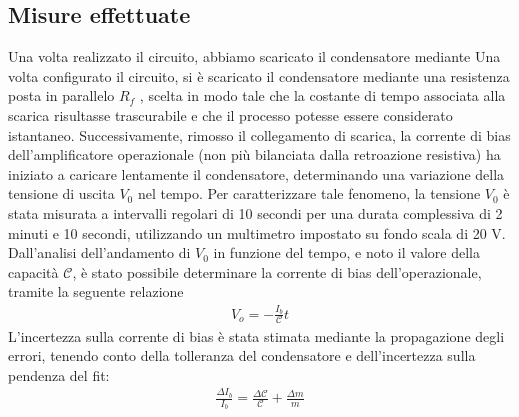 \documentclass[a4paper, oneside]{article}
\begin{document}
\subsection{Misure effettuate}
Una volta realizzato il circuito, abbiamo scaricato il condensatore mediante
Una volta configurato il circuito, si è scaricato il condensatore mediante una resistenza posta in parallelo $R_f$ , scelta in modo tale che la costante di tempo associata alla scarica risultasse trascurabile e che il processo potesse essere considerato istantaneo. Successivamente, rimosso il collegamento di scarica, la corrente di bias dell'amplificatore operazionale (non più bilanciata dalla retroazione resistiva) ha iniziato a caricare lentamente il condensatore, determinando una variazione della tensione di uscita $V_0$ nel tempo. Per caratterizzare tale fenomeno, la tensione $V_0$ è stata misurata a intervalli regolari di 10 secondi per una durata complessiva di 2 minuti e 10 secondi, utilizzando un multimetro impostato su fondo scala di 20 V. Dall'analisi dell'andamento di $V_0$ in funzione del tempo, e noto il valore della capacità $\mathcal{C}$, è stato possibile determinare la corrente di bias dell'operazionale, tramite la seguente relazione
\begin{align}
     V_o= - \frac{I_b}{\mathcal{C}} t
\end{align}
L'incertezza sulla corrente di bias è stata stimata mediante la propagazione degli errori, tenendo conto della tolleranza del condensatore e dell'incertezza sulla pendenza del fit: 
\begin{align}
    \frac{\Delta I_b}{I_b} = \frac{\Delta \mathcal{C}}{\mathcal{C}} + \frac{\Delta m}{m}
\end{align}
\end{document}
